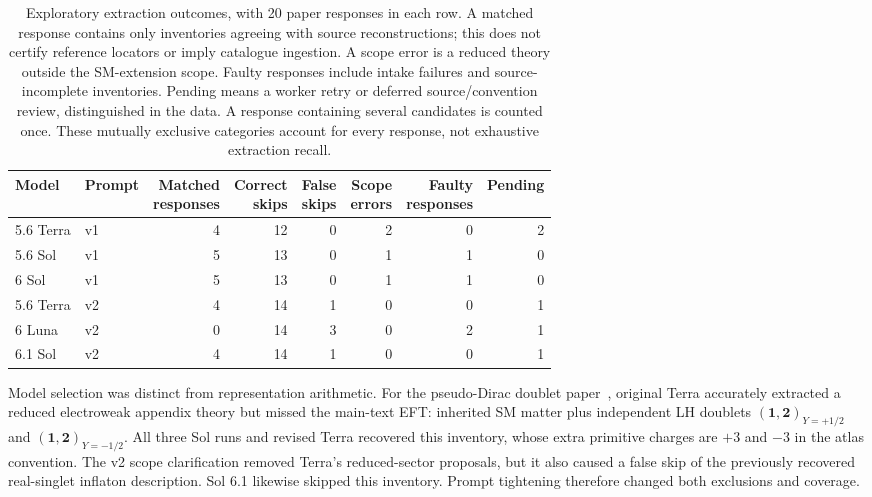 \begin{table}[tb]
\centering
\small
\setlength{\tabcolsep}{4pt}
\begin{tabular}{@{}llrrrrrr@{}}
\toprule
Model & Prompt & \shortstack{Matched\\responses} & \shortstack{Correct\\skips} & \shortstack{False\\skips} & \shortstack{Scope\\errors} & \shortstack{Faulty\\responses} & Pending \\
\midrule
5.6 Terra & v1 & 4 & 12 & 0 & 2 & 0 & 2 \\
5.6 Sol & v1 & 5 & 13 & 0 & 1 & 1 & 0 \\
6 Sol & v1 & 5 & 13 & 0 & 1 & 1 & 0 \\
5.6 Terra & v2 & 4 & 14 & 1 & 0 & 0 & 1 \\
6 Luna & v2 & 0 & 14 & 3 & 0 & 2 & 1 \\
6.1 Sol & v2 & 4 & 14 & 1 & 0 & 0 & 1 \\
\bottomrule
\end{tabular}
\caption{Exploratory extraction outcomes, with 20 paper responses in each row. A matched response contains only inventories agreeing with source reconstructions; this does not certify reference locators or imply catalogue ingestion. A scope error is a reduced theory outside the SM-extension scope. Faulty responses include intake failures and source-incomplete inventories. Pending means a worker retry or deferred source/convention review, distinguished in the data. A response containing several candidates is counted once. These mutually exclusive categories account for every response, not exhaustive extraction recall.}
\label{tab:pilot-results}
\end{table}

Model selection was distinct from representation arithmetic. For the pseudo-Dirac doublet paper~\cite{PilotDoublet}, original Terra accurately extracted a reduced electroweak appendix theory but missed the main-text EFT: inherited SM matter plus independent LH doublets $(\mathbf1,\mathbf2)_{Y=+1/2}$ and $(\mathbf1,\mathbf2)_{Y=-1/2}$. All three Sol runs and revised Terra recovered this inventory, whose extra primitive charges are $+3$ and $-3$ in the atlas convention. The v2 scope clarification removed Terra's reduced-sector proposals, but it also caused a false skip of the previously recovered real-singlet inflaton description. Sol 6.1 likewise skipped this inventory. Prompt tightening therefore changed both exclusions and coverage.

